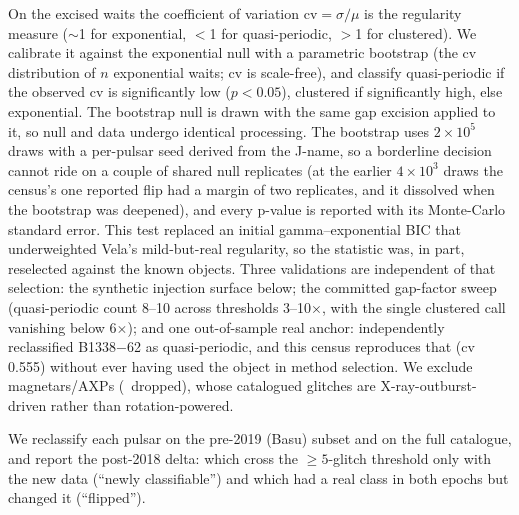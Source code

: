 \documentclass[twocolumn]{aastex631}
\begin{document}
On the excised waits the coefficient of variation $\mathrm{cv}=\sigma/\mu$
is the regularity measure ($\sim$1 for exponential, $<$1 for quasi-periodic, $>$1 for clustered). We
calibrate it against the exponential null with a parametric bootstrap (the cv distribution of $n$
exponential waits; cv is scale-free), and classify quasi-periodic if the observed cv is
significantly low ($p<0.05$), clustered if significantly high, else exponential. The bootstrap null is
drawn with the same gap excision applied to it, so null and data undergo identical processing.
The bootstrap uses $2\times10^5$ draws with a per-pulsar seed derived from the J-name, so a
borderline decision cannot ride on a couple of shared null replicates (at the earlier
$4\times10^3$ draws the census's one reported flip had a margin of two replicates, and it
dissolved when the bootstrap was deepened), and every p-value is reported with its Monte-Carlo
standard error. This test replaced an initial gamma--exponential BIC that underweighted Vela's
mild-but-real regularity, so the statistic was, in part, reselected against the known objects.
Three validations are independent of that selection: the synthetic injection surface below; the
committed gap-factor sweep (quasi-periodic count 8--10 across thresholds 3--10$\times$, with the
single clustered call vanishing below 6$\times$); and one out-of-sample real anchor:
\citet{howitt2018} independently reclassified B1338$-$62 as quasi-periodic, and this census
reproduces that (cv 0.555) without ever having used the object in method selection. We exclude
magnetars/AXPs (\gpRealNMagnetars\ dropped), whose catalogued glitches are
X-ray-outburst-driven rather than rotation-powered.

We reclassify each pulsar on the pre-2019 (Basu) subset and on the full
catalogue, and report the post-2018 delta: which cross the $\ge5$-glitch threshold only with the new data
(``newly classifiable'') and which had a real class in both epochs but changed it (``flipped'').
\end{document}
